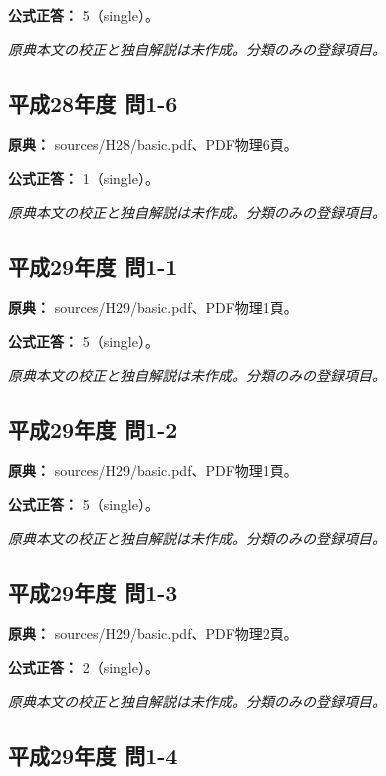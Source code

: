 \textbf{公式正答：} 5（single）。

\par\textit{原典本文の校正と独自解説は未作成。分類のみの登録項目。}

\subsection{平成28年度 問1-6}
\label{q:h28-reg-basic-1-6}

\noindent\textbf{原典：} sources/H28/basic.pdf、PDF物理6頁。

\textbf{公式正答：} 1（single）。

\par\textit{原典本文の校正と独自解説は未作成。分類のみの登録項目。}

\subsection{平成29年度 問1-1}
\label{q:h29-reg-basic-1-1}

\noindent\textbf{原典：} sources/H29/basic.pdf、PDF物理1頁。

\textbf{公式正答：} 5（single）。

\par\textit{原典本文の校正と独自解説は未作成。分類のみの登録項目。}

\subsection{平成29年度 問1-2}
\label{q:h29-reg-basic-1-2}

\noindent\textbf{原典：} sources/H29/basic.pdf、PDF物理1頁。

\textbf{公式正答：} 5（single）。

\par\textit{原典本文の校正と独自解説は未作成。分類のみの登録項目。}

\subsection{平成29年度 問1-3}
\label{q:h29-reg-basic-1-3}

\noindent\textbf{原典：} sources/H29/basic.pdf、PDF物理2頁。

\textbf{公式正答：} 2（single）。

\par\textit{原典本文の校正と独自解説は未作成。分類のみの登録項目。}

\subsection{平成29年度 問1-4}
\label{q:h29-reg-basic-1-4}

